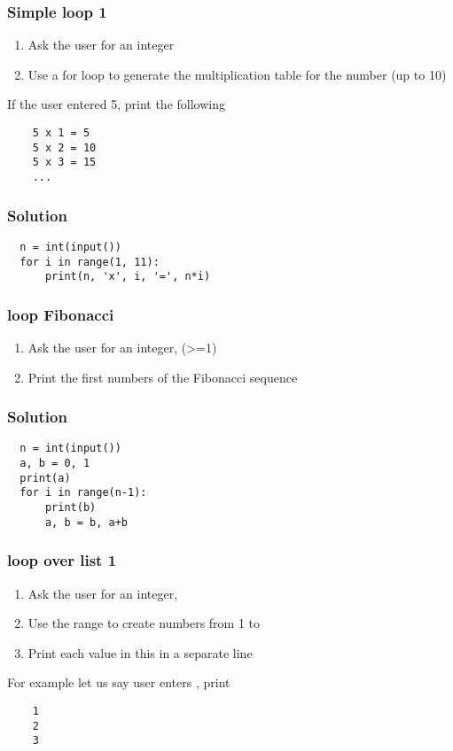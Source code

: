 \documentclass[14pt,compress]{beamer}
\begin{document}
\begin{frame}
  \frametitle{Simple  loop 1}
  \begin{enumerate}
  \item Ask the user for an integer
  \item Use a for loop to generate the multiplication table for the number (up
    to 10)
  \end{enumerate}
  If the user entered 5, print the following
  \begin{lstlisting}
    5 x 1 = 5
    5 x 2 = 10
    5 x 3 = 15
    ...
  \end{lstlisting}
\end{frame}

\begin{frame}
\frametitle{Solution}
\begin{lstlisting}
  n = int(input())
  for i in range(1, 11):
      print(n, 'x', i, '=', n*i)
\end{lstlisting}
\end{frame}

\begin{frame}
  \frametitle{ loop Fibonacci}
  \begin{enumerate}
  \item Ask the user for an integer,  (>=1)
  \item Print the first  numbers of the Fibonacci sequence
  \end{enumerate}
\end{frame}

\begin{frame}
\frametitle{Solution}
\begin{lstlisting}
  n = int(input())
  a, b = 0, 1
  print(a)
  for i in range(n-1):
      print(b)
      a, b = b, a+b
\end{lstlisting}
\end{frame}


\begin{frame}
  \frametitle{ loop over list 1}
  \begin{enumerate}
  \item Ask the user for an integer, 
  \item Use the range to create numbers from 1 to 
  \item Print each value in this in a separate line
  \end{enumerate}
  For example let us say user enters , print
  \begin{lstlisting}
    1
    2
    3
  \end{lstlisting}
\end{frame}
\end{document}
